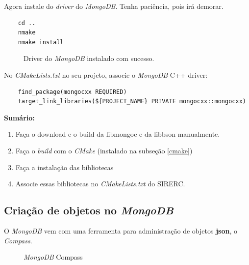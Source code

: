 \documentclass[a4paper,11pt]{article}
\newcommand{\sistema}{\textsf{SIRERC}}
\newcommand{\cmake}{\textit{CMake}}
\newcommand{\mongo}{\textit{MongoDB}}
\begin{document}
Agora instale do \textit{driver} do \mongo{}. Tenha paciência, pois irá demorar.
\begin{mdframed}
\begin{verbatim}
	cd ..
	nmake
	nmake install
\end{verbatim}
\end{mdframed}

\begin{figure}[H]
	\centering
	\caption{Driver do \mongo{} instalado com sucesso.}\label{fig:mongodb_lib_installed}
\end{figure}


No \textit{CMakeLists.txt} no seu projeto, associe o \mongo{} C++ driver:

\begin{verbatim}
	find_package(mongocxx REQUIRED)
	target_link_libraries(${PROJECT_NAME} PRIVATE mongocxx::mongocxx)
\end{verbatim}

\textbf{Sumário:}
\begin{enumerate}
	\item Faça o download e o build  da libmongoc e da libbson manualmente.
	\item Faça o \textit{build} com o \cmake{} (instalado na subseção \ref{cmake})
	\item Faça a instalação das bibliotecas
	\item Associe essas bibliotecas no \textit{CMakeLists.txt} do \sistema{}.
\end{enumerate}

\subsection*{Criação de objetos no \mongo{}}

O \mongo{} vem com uma ferramenta para administração de objetos \textbf{json}, o \textit{Compass}.
\begin{figure}[H]
	\centering
	\caption{\mongo{} Compass}\label{fig:mongo_compass}
\end{figure}
\end{document}
